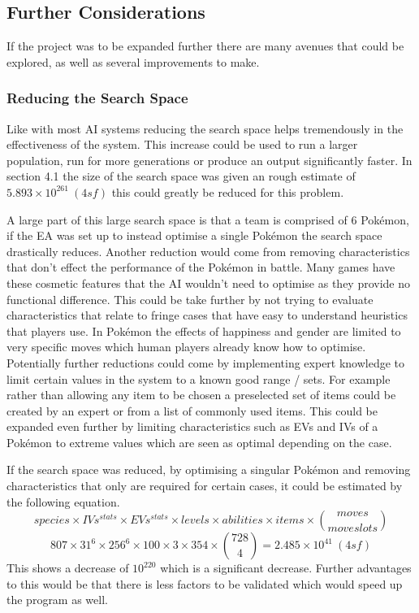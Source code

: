 \documentclass[a4paper]{article}
\newcommand{\Pokemon}{Pok\'{e}mon}
\begin{document}
\subsection{Further Considerations}
\par
If the project was to be expanded further there are many avenues that could be explored, as well as several improvements to make.
\subsubsection{Reducing the Search Space}
\par
Like with most AI systems reducing the search space helps tremendously in the effectiveness of the system.
This increase could be used to run a larger population, run for more generations or produce an output significantly faster.
In section 4.1 the size of the search space was given an rough estimate of $5.893 \times 10^{261}\ (4sf)$ this could greatly be reduced for this problem.
\par
A large part of this large search space is that a team is comprised of 6 \Pokemon{}, if the EA was set up to instead optimise a single \Pokemon{} the search space drastically reduces.
Another reduction would come from removing characteristics that don't effect the performance of the \Pokemon{} in battle.
Many games have these cosmetic features that the AI wouldn't need to optimise as they provide no functional difference.
This could be take further by not trying to evaluate characteristics that relate to fringe cases that have easy to understand heuristics that players use.
In \Pokemon{} the effects of happiness and gender are limited to very specific moves which human players already know how to optimise.
Potentially further reductions could come by implementing expert knowledge to limit certain values in the system to a known good range / sets.
For example rather than allowing any item to be chosen a preselected set of items could be created by an expert or from a list of commonly used items.
This could be expanded even further by limiting characteristics such as EVs and IVs of a \Pokemon{} to extreme values which are seen as optimal depending on the case.
\par
If the search space was reduced, by optimising a singular \Pokemon{} and removing characteristics that only are required for certain cases, it could be estimated by the following equation.
\begin{equation}
	species \times IVs^{stats} \times EVs^{stats} \times levels \times abilities \times items \times {moves \choose move slots}
\end{equation}
\begin{equation}
    807 \times 31^6 \times 256^6 \times 100 \times 3 \times 354 \times {728 \choose 4} = 2.485 \times 10^{41}\ (4sf)
\end{equation}
This shows a decrease of $10^{220}$ which is a significant decrease.
Further advantages to this would be that there is less factors to be validated which would speed up the program as well.
\end{document}
